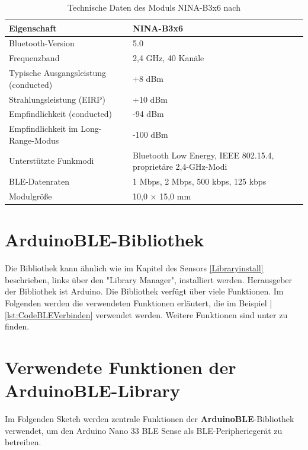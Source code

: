 \begin{table}
	\centering
	\caption{Technische Daten des Moduls NINA-B3x6 nach \cite{Ublox:2023}}
	\label{tab:BLE-Modul1}
	\begin{tabular}{|l|p{8cm}|}
		\hline
		\textbf{Eigenschaft} & \textbf{NINA-B3x6} \\ \hline
		Bluetooth-Version & 5.0 \\ \hline
		Frequenzband & 2{,}4 GHz, 40 Kanäle \\ \hline
		Typische Ausgangsleistung (conducted) & +8 dBm \\ \hline
		Strahlungsleistung (EIRP) & +10 dBm \\ \hline
		Empfindlichkeit (conducted) & -94 dBm \\ \hline
		Empfindlichkeit im Long-Range-Modus & -100 dBm \\ \hline
		Unterstützte Funkmodi & Bluetooth Low Energy, IEEE 802.15.4, proprietäre 2{,}4-GHz-Modi \\ \hline
		BLE-Datenraten & 1 Mbps, 2 Mbps, 500 kbps, 125 kbps \\ \hline
		Modulgröße & 10{,}0 × 15{,}0 mm \\ \hline
	\end{tabular}
	
	
	
\end{table}




\section{ArduinoBLE-Bibliothek}

Die  Bibliothek kann \"ahnlich wie im Kapitel des Sensors  \ref{Libraryinstall} beschrieben, links über den "Library Manager", installiert werden. Herausgeber der Bibliothek ist Arduino. 
Die Bibliothek verf\"ugt \"uber viele Funktionen. Im Folgenden werden die verwendeten Funktionen erl\"autert, die im Beispiel |\ref{lst:CodeBLEVerbinden} verwendet werden. Weitere Funktionen sind unter \cite{Arduino2025a} zu finden.

\section*{Verwendete Funktionen der ArduinoBLE-Library}

Im Folgenden Sketch werden zentrale Funktionen der \textbf{ArduinoBLE}-Bibliothek verwendet, um den Arduino Nano 33 BLE Sense als BLE-Peripheriegerät zu betreiben.

